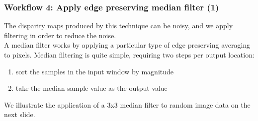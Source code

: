 \documentclass[19pt]{beamer}
\begin{document}
\begin{frame}
\frametitle{Workflow 4: Apply edge preserving median filter (1)}

The disparity maps produced by this technique can be noisy, and we apply filtering in order to reduce the noise.\\[10pt]
%
A median filter works by applying a particular type of edge preserving averaging to pixels. Median filtering is quite simple, requiring two steps per output location:
\begin{enumerate}
\item sort the samples in the input window by magnitude
\item take the median sample value as the output value
\end{enumerate}

We illustrate the application of a 3x3 median filter to random image data on the next slide.

\end{frame}
\end{document}
